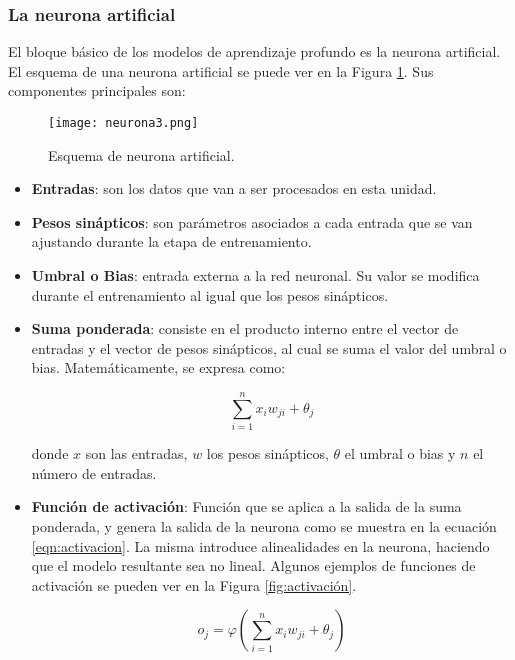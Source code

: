 \subsubsection{La neurona artificial}
El bloque básico de los modelos de aprendizaje profundo es la neurona artificial. El esquema de una neurona artificial se puede ver en la Figura \ref{fig:neurona}. Sus componentes principales son: 

\begin{figure}[H]
  \centering{}
  \texttt{[image: neurona3.png]}
  \caption{Esquema de neurona artificial.}
  \label{fig:neurona}
\end{figure}

\begin{itemize}
    \item \textbf{Entradas}: son los datos que van a ser procesados en esta unidad.
    
    \item \textbf{Pesos sinápticos}: son parámetros asociados a cada entrada que se van ajustando durante la etapa de entrenamiento. 

	\item \textbf{Umbral o Bias}: entrada externa a la red neuronal. Su valor se modifica durante el entrenamiento al igual que los pesos sinápticos.

    \item \textbf{Suma ponderada}: consiste en el producto interno entre el vector de entradas y el vector de pesos sinápticos, al cual se suma el valor del umbral o bias. Matemáticamente, se expresa como:
    
    \begin{equation}
\label{eqn:suma_ponderada}
	\sum_{i=1}^{n}x_{i}w_{ji} +\theta_{j}
\end{equation}
    
    donde $x$ son las entradas, $w$ los pesos sinápticos, $\theta$ el umbral o bias y $n$ el número de entradas.
	
    \item \textbf{Función de activación}: Función que se aplica a la salida de la suma ponderada, y genera la salida de la neurona como se muestra en la ecuación \ref{eqn:activacion}. La misma introduce alinealidades en la neurona, haciendo que el modelo resultante sea no lineal. Algunos ejemplos de funciones de activación se pueden ver en la Figura \ref{fig:activación}. 
    
\begin{equation}
\label{eqn:activacion}
	o_{j} = \varphi (\sum_{i=1}^{n}x_{i}w_{ji}+\theta_{j})
\end{equation}
     
\end{itemize}


